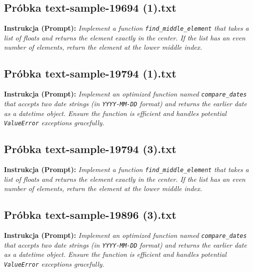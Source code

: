 \subsection{Próbka text-sample-19694 (1).txt}
\label{sec:lst:text-sample-19694-1}
\textbf{Instrukcja (Prompt):} \textit{Implement a function \texttt{find\_middle\_element} that takes a list of floats and returns the element exactly in the center. If the list has an even number of elements, return the element at the lower middle index.}




\subsection{Próbka text-sample-19794 (1).txt}
\label{sec:lst:text-sample-19794-1}
\textbf{Instrukcja (Prompt):} \textit{Implement an optimized function named \texttt{compare\_dates} that accepts two date strings (in \texttt{YYYY-MM-DD} format) and returns the earlier date as a datetime object. Ensure the function is efficient and handles potential \texttt{ValueError} exceptions gracefully.}




\subsection{Próbka text-sample-19794 (3).txt}
\label{sec:lst:text-sample-19794-3}
\textbf{Instrukcja (Prompt):} \textit{Implement a function \texttt{find\_middle\_element} that takes a list of floats and returns the element exactly in the center. If the list has an even number of elements, return the element at the lower middle index.}




\subsection{Próbka text-sample-19896 (3).txt}
\label{sec:lst:text-sample-19896-3}
\textbf{Instrukcja (Prompt):} \textit{Implement an optimized function named \texttt{compare\_dates} that accepts two date strings (in \texttt{YYYY-MM-DD} format) and returns the earlier date as a datetime object. Ensure the function is efficient and handles potential \texttt{ValueError} exceptions gracefully.}

